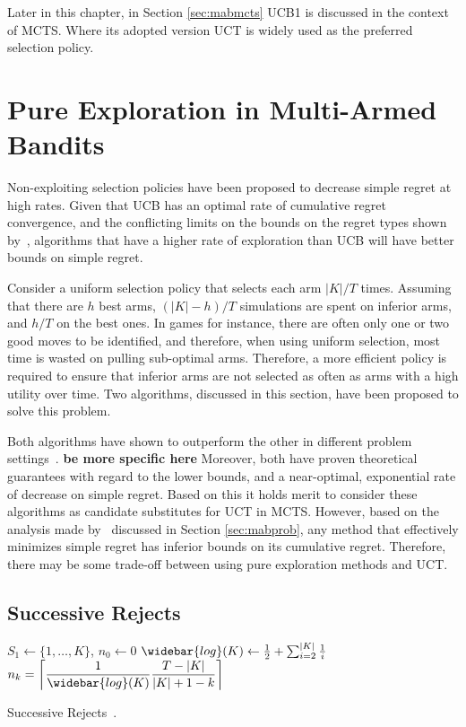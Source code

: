 \documentclass{kecsmstr}
\DeclarePairedDelimiter{\ceil}{\lceil}{\rceil}
\newcommand{\TODO}[1]{\textbf{\color{red}#1}}
\begin{document}
Later in this chapter, in Section \ref{sec:mabmcts} UCB1 is discussed in the context of MCTS. Where its adopted version UCT is widely used as the preferred selection policy.

\section{Pure Exploration in Multi-Armed Bandits}
\label{sec:pureexplmab}
Non-exploiting selection policies have been proposed to decrease simple regret at high rates. Given that UCB has an optimal rate of cumulative regret convergence, and the conflicting limits on the bounds on the regret types shown by~, algorithms that have a higher rate of exploration than UCB will have better bounds on simple regret. 

Consider a uniform selection policy that selects each arm $|K|/T$ times. Assuming that there are $h$ best arms, $(|K|-h)/T$ simulations are spent on inferior arms, and $h/T$ on the best ones. In games for instance, there are often only one or two good moves to be identified, and therefore, when using uniform selection, most time is wasted on pulling sub-optimal arms. Therefore, a more efficient policy is required to ensure that inferior arms are not selected as often as arms with a high utility over time. Two algorithms, discussed in this section, have been proposed to solve this problem.

Both algorithms have shown to outperform the other in different problem settings~. \TODO{be more specific here} Moreover, both have proven theoretical guarantees with regard to the lower bounds, and a near-optimal, exponential rate of decrease on simple regret. Based on this it holds merit to consider these algorithms as candidate substitutes for UCT in MCTS. However, based on the analysis made by~ discussed in Section \ref{sec:mabprob}, any method that effectively minimizes simple regret has inferior bounds on its cumulative regret. Therefore, there may be some trade-off between using pure exploration methods and UCT.

\subsection{Successive Rejects}
\IncMargin{1em}
\begin{algorithm2e}[ht]
	\Indm
	\vspace{0.2cm}
	\Indp
	$S_1 \gets \{1,\dots,K\}$, $n_0 \gets 0$										\; 
	$\widebar{log}(K) \gets \frac{1}{2} + \sum_{i=2}^{|K|} \frac{1}{i}$				\;
	\BlankLine
	 {
		$n_k = \displaystyle\ceil[\bigg]{\frac{1}{\widebar{log}(K)} \frac{T-|K|}{|K|+1-k}}$				\;
	}
	\BlankLine
	\BlankLine
  \caption{Successive Rejects~\protect{}. \label{alg:succrej}}
\end{algorithm2e}
\DecMargin{1em}
\end{document}
